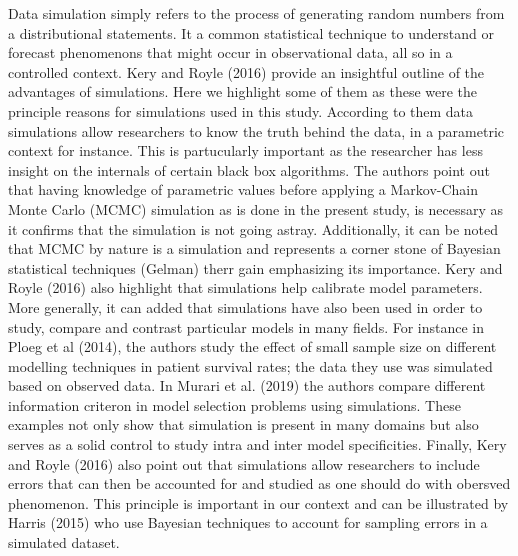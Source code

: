 \documentclass[]{article}
\begin{document}
Data simulation simply refers to the process of generating random
numbers from a distributional statements. It a common statistical
technique to understand or forecast phenomenons that might occur in
observational data, all so in a controlled context. Kery and Royle
(2016) provide an insightful outline of the advantages of simulations.
Here we highlight some of them as these were the principle reasons for
simulations used in this study. According to them data simulations allow
researchers to know the truth behind the data, in a parametric context
for instance. This is partucularly important as the researcher has less
insight on the internals of certain black box algorithms. The authors
point out that having knowledge of parametric values before applying a
Markov-Chain Monte Carlo (MCMC) simulation as is done in the present
study, is necessary as it confirms that the simulation is not going
astray. Additionally, it can be noted that MCMC by nature is a
simulation and represents a corner stone of Bayesian statistical
techniques (Gelman) therr gain emphasizing its importance. Kery and
Royle (2016) also highlight that simulations help calibrate model
parameters. More generally, it can added that simulations have also been
used in order to study, compare and contrast particular models in many
fields. For instance in Ploeg et al (2014), the authors study the effect
of small sample size on different modelling techniques in patient
survival rates; the data they use was simulated based on observed data.
In Murari et al. (2019) the authors compare different information
criteron in model selection problems using simulations. These examples
not only show that simulation is present in many domains but also serves
as a solid control to study intra and inter model specificities.
Finally, Kery and Royle (2016) also point out that simulations allow
researchers to include errors that can then be accounted for and studied
as one should do with obersved phenomenon. This principle is important
in our context and can be illustrated by Harris (2015) who use Bayesian
techniques to account for sampling errors in a simulated dataset.
\end{document}
